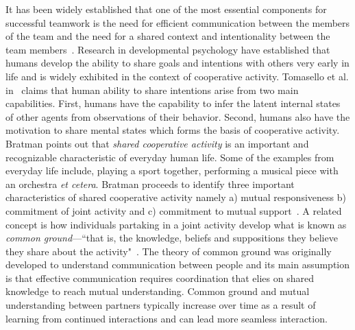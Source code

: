 \documentclass[12pt]{article}
\begin{document}
It has been widely established that one of the most essential components for successful teamwork is the need for efficient communication between the members of the team and the need for a shared context and intentionality between the team members~\cite{tomasello2007shared}. Research in developmental psychology have established that humans develop the ability to share goals and intentions with others very early in life and is widely exhibited in the context of cooperative activity. Tomasello et al. in~\cite{tomasello2007shared} claims that human ability to share intentions arise from two main capabilities. First, humans have the capability to infer the latent internal states of other agents from observations of their behavior. Second, humans also have the motivation to share mental states which forms the basis of cooperative activity. Bratman points out that \textit{shared cooperative activity} is an important and recognizable characteristic of everyday human life. Some of the examples from everyday life include, playing a sport together, performing a musical piece with an orchestra \textit{et cetera}. Bratman proceeds to identify three important characteristics of shared cooperative activity namely a) mutual responsiveness b) commitment of joint activity and c) commitment to mutual support~\cite{bratman1992shared}. A related concept is how individuals partaking in a joint activity develop what is known as \textit{common ground}---``that is, the knowledge, beliefs and suppositions they believe they share about the activity"~\cite{clark1996using}. The theory of common ground was originally developed to understand communication between people and its main assumption is that effective communication requires coordination that elies on shared knowledge to reach mutual understanding.  Common ground and mutual understanding between partners typically increase over time as a result of learning from continued interactions and can lead more seamless interaction.
\end{document}
